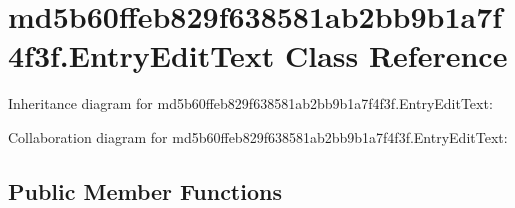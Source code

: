 \hypertarget{classmd5b60ffeb829f638581ab2bb9b1a7f4f3f_1_1_entry_edit_text}{}\section{md5b60ffeb829f638581ab2bb9b1a7f4f3f.\+Entry\+Edit\+Text Class Reference}
\label{classmd5b60ffeb829f638581ab2bb9b1a7f4f3f_1_1_entry_edit_text}


Inheritance diagram for md5b60ffeb829f638581ab2bb9b1a7f4f3f.\+Entry\+Edit\+Text\+:


Collaboration diagram for md5b60ffeb829f638581ab2bb9b1a7f4f3f.\+Entry\+Edit\+Text\+:
\subsection*{Public Member Functions}
